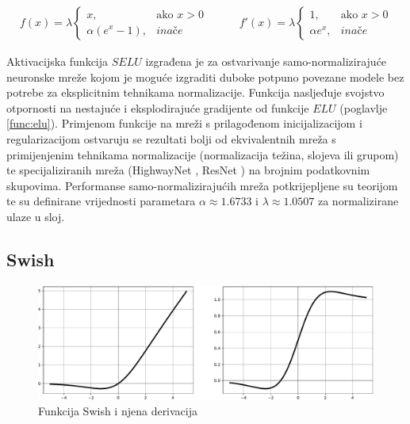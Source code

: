 \documentclass[times, utf8, numeric, diplomski]{fer}
\def\otherwise{\textit{inače}}
\def\secref#1{(poglavlje \ref{#1})}
\def\TODO#1{\noindent\textcolor{red}{TODO: \textit{#1}}\newline}
\def\todo#1{\TODO{#1}}
\def\todoimg#1{\begin{center} \textcolor{red}{\big[ IMAGE: \textit{#1} \big]} \end{center}}
\begin{document}
\begin{equation}
\label{eq:selu}
\begin{split}
f(x) = \lambda
\begin{cases}
x,					& \text{ako } x > 0 \\
\alpha (e^x - 1),	& \otherwise
\end{cases}
\end{split}
\qquad
\begin{split}
f'(x) = \lambda
\begin{cases}
1,	 		& \text{ako } x > 0 \\
\alpha e^x,	& \otherwise
\end{cases}
\end{split}
\end{equation}

Aktivacijska funkcija $SELU$ izgrađena je za ostvarivanje samo-normalizirajuće neuronske mreže kojom je moguće izgraditi duboke potpuno povezane modele bez potrebe za eksplicitnim tehnikama normalizacije. Funkcija nasljeđuje svojstvo otpornosti na nestajuće i eksplodirajuće gradijente od funkcije $ELU$ \secref{func:elu}. Primjenom funkcije na mreži s prilagođenom inicijalizacijom i regularizacijom ostvaruju se rezultati bolji od ekvivalentnih mreža s primijenjenim tehnikama normalizacije (normalizacija težina, slojeva ili grupom) te specijaliziranih mreža (HighwayNet \citep{highwaynet}, ResNet \citep{resnet}) na brojnim podatkovnim skupovima. Performanse samo-normalizirajućih mreža potkrijepljene su teorijom te su definirane vrijednosti parametara $\alpha \approx 1.6733$ i $\lambda \approx 1.0507$ za normalizirane ulaze u sloj. \citep{selu}

%

\subsection{Swish}
\label{func:swish}

\begin{figure}[H]
\includegraphics[width=\textwidth]{func_Swish.pdf}
\centering
\caption{Funkcija Swish i njena derivacija}
\label{fig:swish}
\end{figure}
\end{document}
